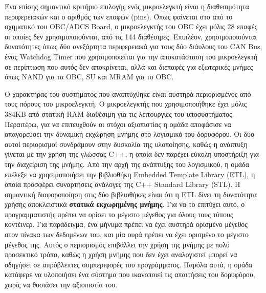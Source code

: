 \documentclass[a4paper,nobib,justified]{tufte-book}
\begin{document}
Ένα επίσης σημαντικό κριτήριο επιλογής ενός μικροελεγκτή είναι η διαθεσιμότητα περιφερειακών και ο αριθμός των επαφών (pins). Όπως φαίνεται στο  από το σχηματικό του OBC/ADCS Board, ο μικροελεγκτής του OBC έχει μόλις 28 επαφές οι οποίες δεν χρησιμοποιούνται, από τις 144 διαθέσιμες. Επιπλέον, χρησιμοποιούνται δυνατότητες όπως δύο ανεξάρτητα περιφερειακά για τους δύο διάυλους του CAN Bus, ένας Watchdog Timer που χρησιμοποιείται για την αποκατάσταση του μικροελεγκτή σε περίπτωση που αυτός δεν αποκρίνεται, αλλά και διεπαφές για εξωτερικές μνήμες όπως NAND για τα OBC, SU και MRAM για το OBC.

\clearpage


Ο χαρακτήρας του συστήματος που αναπτύχθηκε είναι αυστηρά περιορισμένος από τους πόρους του μικροελεγκτή. Ο μικροελεγκτής που χρησιμοποιήθηκε έχει μόλις 384KB από στατική RAM διαθέσιμη για τις λειτουργίες του υποσυστήματος. Περαιτέρω, για να επιτευχθούν οι στόχοι αξιοπιστίας η ομάδα αποφάσισε να απαγορεύσει την δυναμική εκχώρηση μνήμης στο λογισμικό του δορυφόρου. Οι δύο αυτοί περιορισμοί συνδράμουν στην δυσκολία της υλοποίησης, καθώς η ανάπτυξη γίνεται με την χρήση της γλώσσας C++, η οποία δεν παρέχει εύκολη υποστήριξη για την διαχείριση της μνήμης. Από την αρχή της ανάπτυξης του λογισμικού, η ομάδα επέλεξε να χρησιμοποιήσει την βιβλιοθήκη Embedded Template Library (ETL),  η οποία προσφέρει συναρτήσεις ανάλογες της C++ Standard Library (STL). Η σημαντική διαφοροποίηση στις δύο βιβλιοθήκες είναι ότι η ETL δίνει τη δυνατότητα χρήσης αποκλειστικά \textbf{στατικά εκχωρημένης μνήμης}. Για να το επιτύχει αυτό, ο προγραμματιστής πρέπει να ορίσει το μέγιστο μέγεθος για όλους τους τύπους κοντέινερ. Για παράδειγμα, ένα μήνυμα πρέπει να έχει αυστηρά ορισμένο μέγεθος στον πίνακα των δεδομένων του, και μία ουρά πρέπει να έχει ορισμένο το μέγιστο μέγεθος της. Αυτός ο περιορισμός επιβάλλει την χρήση της μνήμης με πολύ προσεκτικό τρόπο, καθώς η χρήση μνήμης που δεν έχει αναλογιστεί μπορεί να οδηγήσει σε απρόβλεπτες συμπεριφορές του προγράμματος. Παρόλα αυτά, η ομάδα κατάφερε να υλοποιήσει ένα σύστημα που ικανοποιεί τις απαιτήσεις του δορυφόρου, χωρίς να θυσιάσει την αξιοπιστία του.
\end{document}
